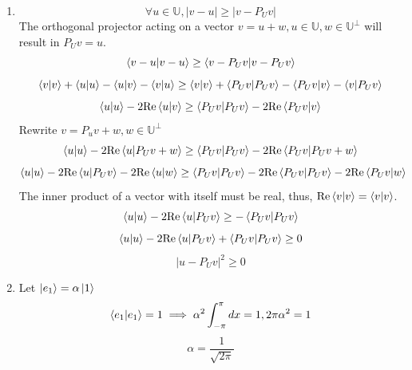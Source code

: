 \begin{sol}
\begin{enumerate}[label=\textbf{(\alph*)}]
\item
\begin{equation}
	\forall u\in\mathbb U, |v-u|\geq|v-P_U v|
\end{equation} 
The orthogonal projector acting on a vector $v=u+w, u\in\mathbb U, w\in\mathbb U^\perp$ will result in $P_Uv=u$.
\begin{equation}
	\braket{v-u}{v-u}\geq\braket{v-P_Uv}{v-P_Uv}
\end{equation}
\begin{equation}
	\braket{v}{v}+\braket{u}{u}-\braket{u}{v}-\braket{v}{u}\geq\braket{v}{v}+\braket{P_Uv}{P_Uv}-\braket{P_Uv}{v}-\braket{v}{P_Uv}
\end{equation}
\begin{equation}
	\braket{u}{u}-2\mathrm{Re}\braket{u}{v}\geq\braket{P_Uv}{P_Uv}-2\mathrm{Re}\braket{P_Uv}{v}
\end{equation}
Rewrite $v=P_uv+w, w\in\mathbb U^\perp$
\begin{equation}
	\braket{u}{u}-2\mathrm{Re}\braket{u}{P_Uv+w}\geq\braket{P_Uv}{P_Uv}-2\mathrm{Re}\braket{P_Uv}{P_Uv+w}
\end{equation}
\begin{equation}
	\braket{u}{u}-2\mathrm{Re}\braket{u}{P_Uv}-2\mathrm{Re}\braket{u}{w}\geq\braket{P_Uv}{P_Uv}-2\mathrm{Re}\braket{P_Uv}{P_Uv}-2\mathrm{Re}\braket{P_Uv}{w}
\end{equation}
The inner product of a vector with itself must be real, thus, $\mathrm{Re}\braket{v}{v}=\braket{v}{v}$.
\begin{equation}
	\braket{u}{u}-2\mathrm{Re}\braket{u}{P_Uv}\geq-\braket{P_Uv}{P_Uv}
\end{equation}
\begin{equation}
	\braket{u}{u}-2\mathrm{Re}\braket{u}{P_Uv}+\braket{P_Uv}{P_Uv}\geq 0
\end{equation}
\begin{equation}
	|u-P_Uv|^2\geq 0
\end{equation} 
\item
Let $\ket{e_1}= \alpha\ket{1}$
\begin{equation}
	\braket{e_1}{e_1}=1\implies \alpha^2\int_{-\pi}^\pi dx=1, 2\pi\alpha^2=1
\end{equation} \begin{equation}
	\alpha=\frac{1}{\sqrt{2\pi}}
\end{equation} \begin{equation}

\end{equation}
\end{enumerate}
\end{sol}
